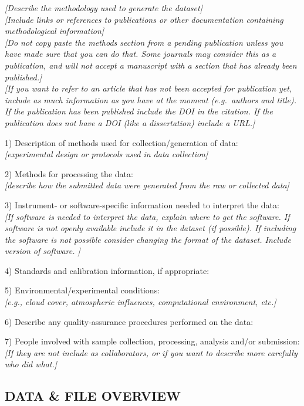 \documentclass[]{article}
\begin{document}
\emph{{[}Describe the methodology used to generate the dataset{]}}\\
\emph{{[}Include links or references to publications or other
documentation containing methodological information{]}}\\
\emph{{[}Do not copy paste the methods section from a pending
publication unless you have made sure that you can do that. Some
journals may consider this as a publication, and will not accept a
manuscript with a section that has already been published.{]}}\\
\emph{{[}If you want to refer to an article that has not been accepted
for publication yet, include as much information as you have at the
moment (e.g.~authors and title). If the publication has been published
include the DOI in the citation. If the publication does not have a DOI
(like a dissertation) include a URL.{]}}

1) Description of methods used for collection/generation of data:\\
\emph{{[}experimental design or protocols used in data collection{]}}

2) Methods for processing the data:\\
\emph{{[}describe how the submitted data were generated from the raw or
collected data{]}}

3) Instrument- or software-specific information needed to interpret the
data:\\
\emph{{[}If software is needed to interpret the data, explain where to
get the software. If software is not openly available include it in the
dataset (if possible). If including the software is not possible
consider changing the format of the dataset. Include version of
software. {]}}

4) Standards and calibration information, if appropriate:

5) Environmental/experimental conditions:\\
\emph{{[}e.g., cloud cover, atmospheric influences, computational
environment, etc.{]}}

6) Describe any quality-assurance procedures performed on the data:

7) People involved with sample collection, processing, analysis and/or
submission:\\
\emph{{[}If they are not include as collaborators, or if you want to
describe more carefully who did what.{]}}

\subsection{DATA \& FILE OVERVIEW}\label{data-file-overview}
\end{document}
